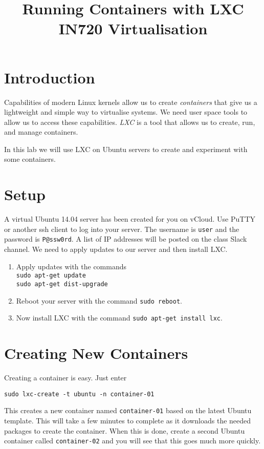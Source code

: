 \documentclass{article}
\begin{document}
\title{Running Containers with LXC\\ IN720 Virtualisation}
\date{}
\maketitle

\section*{Introduction}
Capabilities of modern Linux kernels allow us to create \emph{containers} that give us a lightweight and simple way to virtualise systems. We need user space tools to allow us to access these capabilities.  \emph{LXC} is a tool that allows us to create, run, and manage containers.

In this lab we will use LXC on Ubuntu servers to create and experiment with some containers.

\section{Setup}
A virtual Ubuntu 14.04 server has been created for you on vCloud.  Use PuTTY or another ssh client to log into your server. The username is \texttt{user} and the password is \texttt{P@ssw0rd}. A list of IP addresses will be posted on the class Slack channel. We need to apply updates to our server and then install LXC.

\begin{enumerate}
	\item Apply updates with the commands \\
	\texttt{sudo apt-get update} \\
	\texttt{sudo apt-get dist-upgrade}
	\item Reboot your server with the command \texttt{sudo reboot}.
	\item Now install LXC with the command \texttt{sudo apt-get install lxc}.
\end{enumerate} 

\section{Creating New Containers}
Creating a container is easy.  Just enter
\begin{verbatim}
sudo lxc-create -t ubuntu -n container-01
\end{verbatim}

This creates a new container named \texttt{container-01} based on the latest Ubuntu template.  This will take a few minutes to complete as it downloads the needed packages to create the container.  When this is done, create a second Ubuntu container called \texttt{container-02} and you will see that this goes much more quickly.
\end{document}
